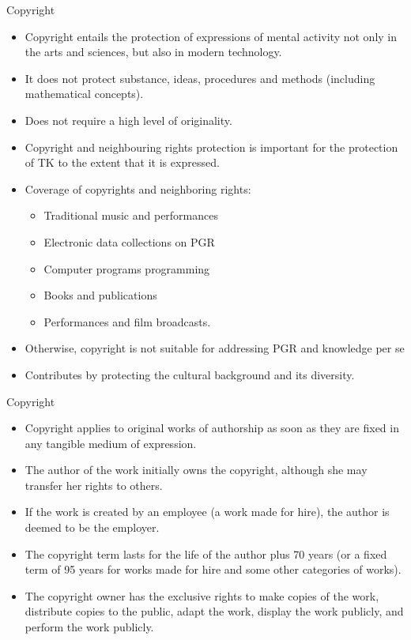 \documentclass[ignorenonframetext,aspectratio=169]{beamer}
\providecommand{\tightlist}{%
  \setlength{\itemsep}{0pt}\setlength{\parskip}{0pt}}
\begin{document}
\begin{frame}{Copyright}
\protect\hypertarget{copyright}{}

\small

\begin{itemize}
\tightlist
\item
  Copyright entails the protection of expressions of mental activity not
  only in the arts and sciences, but also in modern technology.
\item
  It does not protect substance, ideas, procedures and methods
  (including mathematical concepts).
\item
  Does not require a high level of originality.
\item
  Copyright and neighbouring rights protection is important for the
  protection of TK to the extent that it is expressed.
\item
  Coverage of copyrights and neighboring rights:

  \begin{itemize}
  \tightlist
  \item
    Traditional music and performances
  \item
    Electronic data collections on PGR
  \item
    Computer programs programming
  \item
    Books and publications
  \item
    Performances and film broadcasts.
  \end{itemize}
\item
  Otherwise, copyright is not suitable for addressing PGR and knowledge
  per se
\item
  Contributes by protecting the cultural background and its diversity.
\end{itemize}

\end{frame}

\begin{frame}{Copyright}
\protect\hypertarget{copyright-1}{}

\begin{itemize}
\tightlist
\item
  Copyright applies to original works of authorship as soon as they are
  fixed in any tangible medium of expression.
\item
  The author of the work initially owns the copyright, although she may
  transfer her rights to others.
\item
  If the work is created by an employee (a work made for hire), the
  author is deemed to be the employer.
\item
  The copyright term lasts for the life of the author plus 70 years (or
  a fixed term of 95 years for works made for hire and some other
  categories of works).
\item
  The copyright owner has the exclusive rights to make copies of the
  work, distribute copies to the public, adapt the work, display the
  work publicly, and perform the work publicly.
\end{itemize}

\end{frame}
\end{document}
